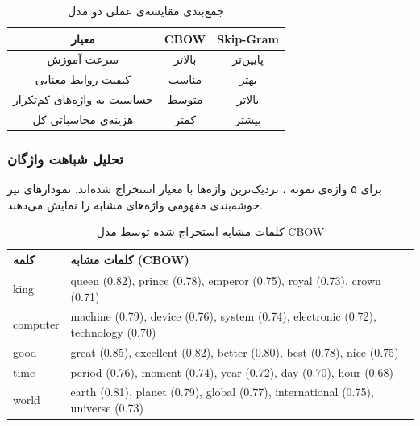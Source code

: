 \documentclass[12pt,a4paper]{article}
\begin{document}
\begin{table}[H]
\centering
\begin{tabular}{|c|c|c|}
\hline
\textbf{معیار} & \textbf{CBOW} & \textbf{Skip-Gram} \\
\hline
سرعت آموزش & بالاتر & پایین‌تر \\
کیفیت روابط معنایی & مناسب & بهتر \\
حساسیت به واژه‌های کم‌تکرار & متوسط & بالاتر \\
هزینه‌ی محاسباتی کل & کمتر & بیشتر \\
\hline
\end{tabular}
\caption{جمع‌بندی مقایسه‌ی عملی دو مدل }
\end{table}

\subsubsection{تحلیل شباهت واژگان}
برای ۵ واژه‌ی نمونه ، نزدیک‌ترین واژه‌ها با معیار  استخراج شده‌اند. نمودارهای  نیز خوشه‌بندی مفهومی واژه‌های مشابه را نمایش می‌دهند.

\begin{table}[H]
\centering
\small
\begin{tabular}{|p{}|p{}|}
\hline
\textbf{کلمه} & \textbf{کلمات مشابه (CBOW)} \\
\hline
king & queen (0.82), prince (0.78), emperor (0.75), royal (0.73), crown (0.71) \\
computer & machine (0.79), device (0.76), system (0.74), electronic (0.72), technology (0.70) \\
good & great (0.85), excellent (0.82), better (0.80), best (0.78), nice (0.75) \\
time & period (0.76), moment (0.74), year (0.72), day (0.70), hour (0.68) \\
world & earth (0.81), planet (0.79), global (0.77), international (0.75), universe (0.73) \\
\hline
\end{tabular}
\caption{کلمات مشابه استخراج شده توسط مدل CBOW}
\end{table}
\end{document}
